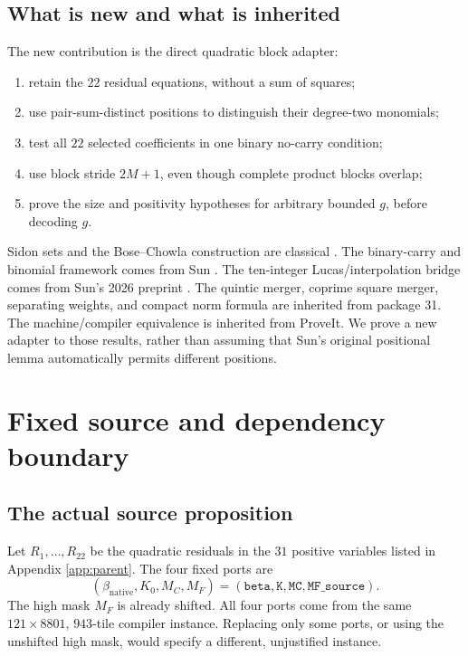 \documentclass[11pt,a4paper]{article}
\theoremstyle{remark}
\begin{document}
\subsection{What is new and what is inherited}
The new contribution is the direct quadratic block adapter:
\begin{enumerate}
\item retain the \(22\) residual equations, without a sum of squares;
\item use pair-sum-distinct positions to distinguish their degree-two
monomials;
\item test all \(22\) selected coefficients in one binary no-carry
condition;
\item use block stride \(2M+1\), even though complete product blocks
overlap;
\item prove the size and positivity hypotheses for arbitrary bounded
\(g\), before decoding \(g\).
\end{enumerate}
Sidon sets and the Bose--Chowla construction are classical
\cite{bose,nathanson}. The binary-carry and binomial framework comes from
Sun \cite{sun2021}. The ten-integer Lucas/interpolation bridge comes from
Sun's 2026 preprint \cite{sun2026}. The quintic merger, coprime square
merger, separating weights, and compact norm formula are inherited from
package 31. The machine/compiler equivalence is inherited from ProveIt.
We prove a new adapter to those results, rather than assuming that Sun's
original positional lemma automatically permits different positions.

\section{Fixed source and dependency boundary}\label{sec:fixed}
\subsection{The actual source proposition}
Let \(R_1,\ldots,R_{22}\) be the quadratic residuals in the \(31\) positive
variables listed in Appendix \ref{app:parent}. The four fixed ports are
\[
(\beta_{\mathrm{native}},K_0,M_C,M_F)
=(\texttt{beta},\texttt{K},\texttt{MC},\texttt{MF\_source}).
\]
The high mask \(M_F\) is already shifted. All four ports come from the
same \(121\times8801\), \(943\)-tile compiler instance. Replacing only
some ports, or using the unshifted high mask, would specify a different,
unjustified instance.
\end{document}
